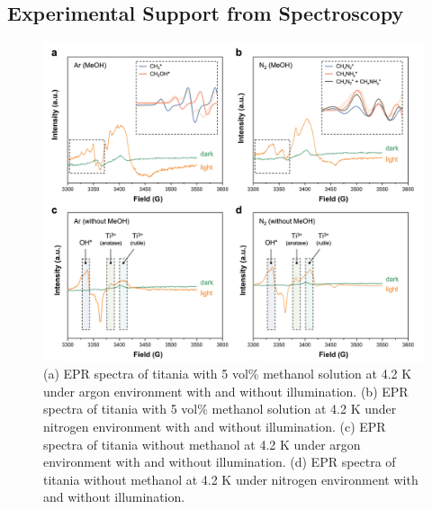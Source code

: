 \subsection{Experimental Support from Spectroscopy}
\begin{figure}
    \centering
    \includegraphics[width=1\linewidth]{figures/proposal_figures/Fig1_6_14_23.jpg}
    \caption{(a) EPR spectra of titania with 5 vol\% methanol solution at 4.2 K under argon environment with and without illumination. (b)  EPR spectra of titania with 5 vol\% methanol solution at 4.2 K under nitrogen environment with and without illumination. (c) EPR spectra of titania without methanol at 4.2 K under argon environment with and without illumination. (d) EPR spectra of titania without methanol at 4.2 K under nitrogen environment with and without illumination.}
    \label{EPR figure 1}
\end{figure}


